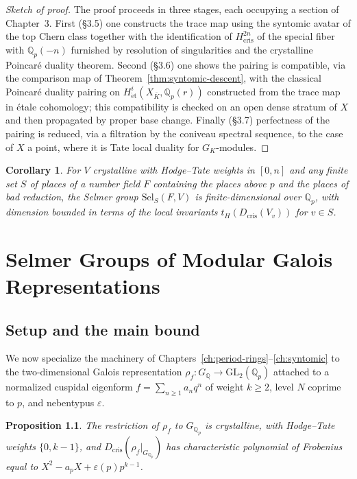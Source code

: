 \documentclass[10pt]{amsbook}
\newtheorem{proposition}[theorem]{Proposition}
\newtheorem{corollary}[theorem]{Corollary}
\theoremstyle{definition}
\theoremstyle{remark}
\newcommand{\Qp}{\mathbb{Q}_p}
\begin{document}
\begin{proof}[Sketch of proof]
The proof proceeds in three stages, each occupying a section of Chapter~3. First
(\S 3.5) one constructs the trace map using the syntomic avatar of the top Chern class
together with the identification of $H^{2n}_{\mathrm{cris}}$ of the special fiber with
$\Qp(-n)$ furnished by resolution of singularities and the crystalline Poincar\'e duality
theorem. Second (\S 3.6) one shows the pairing is compatible, via the comparison map of
Theorem~\ref{thm:syntomic-descent}, with the classical Poincar\'e duality pairing on
$H^i_{\mathrm{\acute et}}(X_{\overline K}, \Qp(r))$ constructed from the trace map in
\'etale cohomology; this compatibility is checked on an open dense stratum of $X$ and then
propagated by proper base change. Finally (\S 3.7) perfectness of the pairing is reduced,
via a filtration by the coniveau spectral sequence, to the case of $X$ a point, where it is
Tate local duality for $G_K$-modules.
\end{proof}

\begin{corollary}\label{cor:selmer-finiteness}
For $V$ crystalline with Hodge--Tate weights in $[0, n]$ and any finite set $S$ of places of
a number field $F$ containing the places above $p$ and the places of bad reduction, the
Selmer group $\mathrm{Sel}_S(F, V)$ is finite-dimensional over $\Qp$, with dimension bounded
in terms of the local invariants $t_H(D_{\mathrm{cris}}(V_v))$ for $v \in S$.
\end{corollary}

\chapter{Selmer Groups of Modular Galois Representations}
\label{ch:selmer}

\section{Setup and the main bound}

We now specialize the machinery of Chapters~\ref{ch:period-rings}--\ref{ch:syntomic} to the
two-dimensional Galois representation $\rho_f \colon G_{\mathbb{Q}} \to
\mathrm{GL}_2(\Qp)$ attached to a normalized cuspidal eigenform $f = \sum_{n \geq 1} a_n q^n$
of weight $k \geq 2$, level $N$ coprime to $p$, and nebentypus $\varepsilon$.

\begin{proposition}\label{prop:rhof-crystalline}
The restriction of $\rho_f$ to $G_{\Qp}$ is crystalline, with Hodge--Tate weights
$\{0, k-1\}$, and $D_{\mathrm{cris}}(\rho_f|_{G_{\Qp}})$ has characteristic polynomial of
Frobenius equal to $X^2 - a_p X + \varepsilon(p) p^{k-1}$.
\end{proposition}
\end{document}
